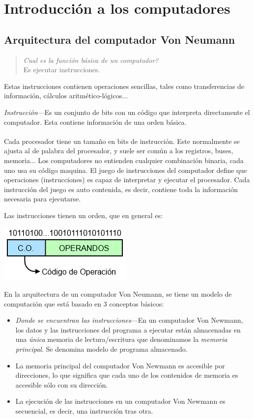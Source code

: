 \documentclass[a4paper,11pt,spanish]{report}
\begin{document}
\chapter{Introducción a los computadores}
\section{Arquitectura del computador Von Neumann}

\begin{quote}
\begin{center}
\emph{\textquestiondown Cual es la función básica de un computador?} \\ Es ejecutar instrucciones.
\end{center}
\end{quote}
Estas instrucciones contienen operaciones sencillas, tales como transferencias de información, cálculos aritmético-lógicos...

\emph{Instrucción}---Es un conjunto de bits con un código que interpreta directamente el computador. Esta contiene información de una orden básica.
\\\\
Cada procesador tiene un tamaño en bits de instrucción. Este normalmente se ajusta al de palabra del procesador, y suele ser común a los registros, buses, memoria...
Los computadores no entienden cualquier combinación binaria, cada uno usa su código maquina.
El juego de instrucciones del computador define que operaciones (instrucciones) es capaz de interpretar y ejecutar el procesador.
Cada instrucción del juego es auto contenida, es decir, contiene toda la información necesaria para ejecutarse.

Las instrucciones tienen un orden, que en general es:

\begin{center}
\includegraphics{res/tema1/instrucciones.png}
\end{center}

En la arquitectura de un computador Von Neumann, se tiene un modelo de computación que está basado en 3 conceptos básicos:
\begin{itemize}
\item \emph{Donde se encuentran las instrucciones}---En un computador Von Newmann, los datos y las instrucciones del programa a ejecutar están almacenadas en una \emph{única} memoria de lectura/escritura que denominamos la \emph{memoria principal}. Se denomina modelo de programa almacenado.
\item La memoria principal del computador Von Newmann es accesible por direcciones, lo que significa que cada uno de los contenidos de memoria es accesible sólo con su dirección.
\item La ejecución de las instrucciones en un computador Von Newmann es secuencial, es decir, una instrucción tras otra.
\end{itemize}
\end{document}
